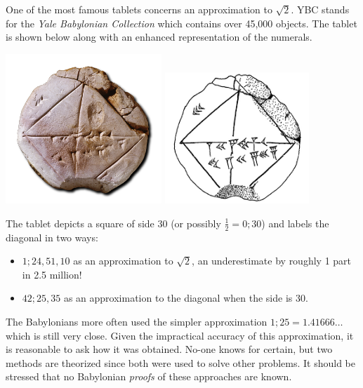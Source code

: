 \label{ybc7289}

One of the most famous tablets concerns an approximation to $\sqrt 2$. YBC stands for the \emph{Yale Babylonian Collection} which contains over 45,000 objects. The tablet is shown below along with an enhanced representation of the numerals.
\begin{center}
	\includegraphics[height=160pt]{YBC7289.png}
	\qquad
	\includegraphics[height=140pt]{ybc.png}
\end{center}

The tablet depicts a square of side 30 (or possibly $\frac 12=0;30$) and labels the diagonal in two ways:
\begin{itemize}\itemsep0pt
  \item $1;24,51,10$ as an approximation to $\sqrt 2$, an underestimate by roughly 1 part in 2.5 million!
  \item $42;25,35$ as an approximation to the diagonal when the side is 30.
\end{itemize}
The Babylonians more often used the simpler approximation $1;25=1.41666\ldots$ which is still very close. Given the impractical accuracy of this approximation, it is reasonable to ask how it was obtained. No-one knows for certain, but two methods are theorized since both were used to solve other problems. It should be stressed that no Babylonian \emph{proofs} of these approaches are known.

